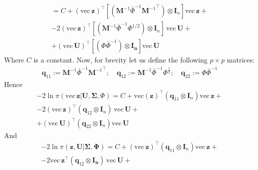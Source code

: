 \documentclass[openany, 11pt, oneside]{book}
\begin{document}
\begin{subappendices}
\begin{align*}
%
= C + (\mathrm{vec}\,\boldsymbol{z})^{\top}
\left[ \left(
 \boldsymbol{M}^{-1} \bar{\Phi}^{-1}{\boldsymbol{M}^{-1}}^\top
\right) \otimes \boldsymbol{I}_n \right] 
\mathrm{vec}\,\boldsymbol{z} +\\ 
%
- 2(\mathrm{vec}\,\boldsymbol{z})^{\top} 
\left[ \left(  \boldsymbol{M}^{-1} \bar{\Phi}^{-1} \Phi^{1/2}  \right)
\otimes \boldsymbol{I}_n \right]  \,\mathrm{vec}\,\boldsymbol{U}  +\\
%
+  (\mathrm{vec}\,\boldsymbol{U})^{\top}
    \left[ \left(  \Phi  \bar{\Phi}^{-1}  \right) \otimes \boldsymbol{I_n} \right]
   \mathrm{vec}\,\boldsymbol{U}
\end{align*}
Where $C$ is a constant. Now, for brevity let us define the following $p \times p$ matrices:
\begin{align*}
\boldsymbol{q}_{11} :=  \boldsymbol{M}^{-1} \bar{\Phi}^{-1}{\boldsymbol{M}^{-1}}^\top; \quad
\boldsymbol{q}_{12} :=  \boldsymbol{M}^{-1} \bar{\Phi}^{-1} \Phi^{\frac{1}{2}}; \quad
\boldsymbol{q}_{22} := \Phi \bar{\Phi}^{-1}
\end{align*}
Hence 
\begin{align*}
-2 \ln \pi \left(\mathrm{vec}\,\boldsymbol{z} \vert \boldsymbol{U}, \boldsymbol{\Sigma}, \Phi \right) 
= C + \mathrm{vec}(\boldsymbol{z})^{\top}
\left(\boldsymbol{q}_{11} \otimes \boldsymbol{I}_n \right) 
\mathrm{vec}\,\boldsymbol{z} +\\
%
- 2(\mathrm{vec}\,\boldsymbol{z})^{\top} 
\left(  \boldsymbol{q}_{12} \otimes \boldsymbol{I}_n \right)  \,\mathrm{vec}\,\boldsymbol{U}+\\
%
+  (\mathrm{vec}\,\boldsymbol{U})^{\top}
    \left(\boldsymbol{q}_{22} \otimes \boldsymbol{I}_n \right)
   \mathrm{vec}\,\boldsymbol{U}
\end{align*}
And
\begin{align*}
-2 \ln \pi \left(\boldsymbol{z}, \boldsymbol{U} \vert \boldsymbol{\Sigma}, \boldsymbol{\Phi} \right)  
= C + (\mathrm{vec}\,\boldsymbol{z})^{\top}
\left(\boldsymbol{q}_{11} \otimes \boldsymbol{I}_n \right) 
\mathrm{vec}\,\boldsymbol{z} +\\ 
%
- 2\mathrm{vec} \,\boldsymbol{z}^{\top} 
\left(  \boldsymbol{q}_{12} \otimes \boldsymbol{I_n} \right)  \,\mathrm{vec}\, \boldsymbol{U}+\\  

\end{align*}
\end{subappendices}
\end{document}
